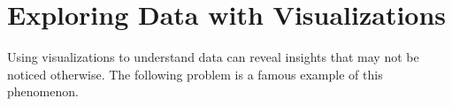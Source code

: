 \label{lab:DataVis}


\section*{Exploring Data with Visualizations} %

Using visualizations to understand data can reveal insights that may not be noticed otherwise.
The following problem is a famous example of this phenomenon.

